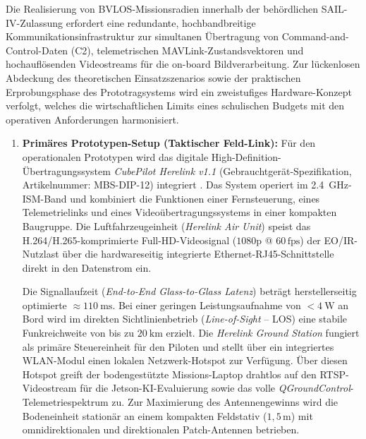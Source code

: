 Die Realisierung von BVLOS-Missionsradien innerhalb der behördlichen SAIL-IV-Zulassung erfordert eine redundante, hochbandbreitige Kommunikationsinfrastruktur zur simultanen Übertragung von Command-and-Control-Daten (C2), 
telemetrischen MAVLink-Zustandsvektoren und hochauflösenden Videostreams für die on-board Bildverarbeitung. Zur lückenlosen Abdeckung des theoretischen Einsatzszenarios sowie der praktischen Erprobungsphase des Prototragsystems wird 
ein zweistufiges Hardware-Konzept verfolgt, welches die wirtschaftlichen Limits eines schulischen Budgets mit den operativen Anforderungen harmonisiert.

\begin{enumerate}
    \item \textbf{Primäres Prototypen-Setup (Taktischer Feld-Link):} Für den operationalen Prototypen wird das digitale High-Definition-Übertragungssystem \textit{CubePilot Herelink v1.1} (Gebrauchtgerät-Spezifikation, Artikelnummer: MBS-DIP-12) 
    integriert \cite{mybotshop_herelink}. Das System operiert im \SI{2.4}{\GHz}-ISM-Band und kombiniert die Funktionen einer Fernsteuerung, eines Telemetrielinks und eines Videoübertragungssystems in einer kompakten Baugruppe. 
    Die Luftfahrzeugeinheit (\textit{Herelink Air Unit}) speist das H.264/H.265-komprimierte Full-HD-Videosignal ($1080\text{p}$ @ $60\,\text{fps}$) der EO/IR-Nutzlast über die hardwareseitig integrierte Ethernet-RJ45-Schnittstelle 
    direkt in den Datenstrom ein. 
    
    Die Signallaufzeit (\textit{End-to-End Glass-to-Glass Latenz}) beträgt herstellerseitig optimierte $\approx \SI{110}{\ms}$. Bei einer geringen Leistungsaufnahme von $< \SI{4}{\W}$ an Bord wird im direkten Sichtlinienbetrieb 
    (\textit{Line-of-Sight} -- LOS) eine stabile Funkreichweite von bis zu $\SI{20}{\km}$ erzielt. Die \textit{Herelink Ground Station} fungiert als primäre Steuereinheit für den Piloten und stellt über ein integriertes WLAN-Modul 
    einen lokalen Netzwerk-Hotspot zur Verfügung. Über diesen Hotspot greift der bodengestützte Missions-Laptop drahtlos auf den RTSP-Videostream für die Jetson-KI-Evaluierung sowie das volle \textit{QGroundControl}-Telemetriespektrum zu. 
    Zur Maximierung des Antennengewinns wird die Bodeneinheit stationär an einem kompakten Feldstativ ($1{,}5\,\text{m}$) mit omnidirektionalen und direktionalen Patch-Antennen betrieben.
    

\end{enumerate}
